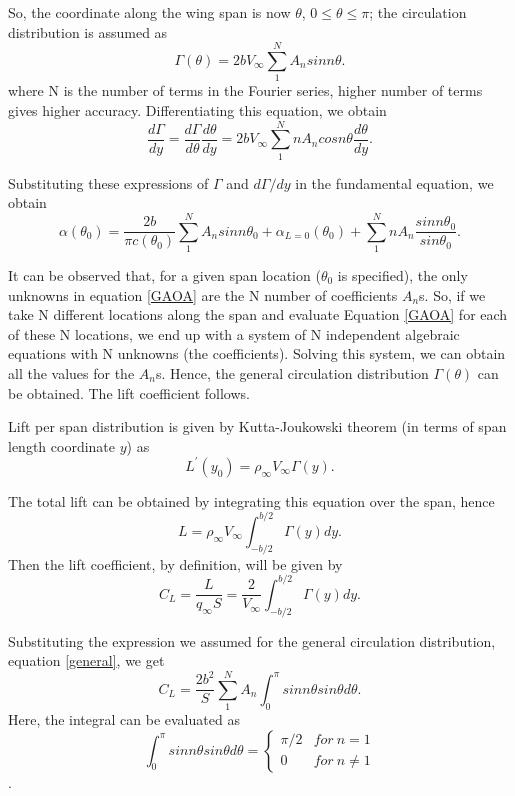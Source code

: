 \documentclass[letterpaper,12pt]{article}
\begin{document}
So, the coordinate along the wing span is now $\theta$, $0\leq\theta\leq\pi$; the circulation distribution is assumed as
\begin{equation}
\Gamma(\theta) = 2bV_\infty\sum_1^NA_nsinn\theta.
\label{general}
\end{equation}
where N is the number of terms in the Fourier series, higher number of terms gives higher accuracy. Differentiating this equation, we obtain
\begin{equation}
\frac{d\Gamma}{dy} = \frac{d\Gamma}{d\theta}\frac{d\theta}{dy} = 2bV_\infty\sum_1^NnA_ncosn\theta\frac{d\theta}{dy}.
\end{equation}

Substituting these expressions of $\Gamma$ and $d\Gamma/dy$ in the fundamental equation, we obtain
\begin{equation}
\boxed{
\alpha(\theta_0) = \frac{2b}{\pi c(\theta_0)}\sum_1^NA_nsinn\theta_0+\alpha_{L=0}(\theta_0)+\sum_1^NnA_n\frac{sinn\theta_0}{sin\theta_0}.
}
\label{GAOA}
\end{equation}

It can be observed that, for a given span location ($\theta_0$ is specified), the only unknowns in equation \ref{GAOA} are the N number of coefficients $A_n$s. So, if we take N different locations along the span and evaluate Equation \ref{GAOA} for each of these N locations, we end up with a system of N independent algebraic equations with N unknowns (the coefficients). Solving this system, we can obtain all the values for the $A_n$s. Hence, the general circulation distribution $\Gamma(\theta)$ can be obtained. The lift coefficient follows.

Lift per span distribution is given by Kutta-Joukowski theorem (in terms of span length coordinate $y$) as
\begin{equation}
L^{'}(y_0) = \rho_\infty V_\infty \Gamma(y).
\end{equation}

The total lift can be obtained by integrating this equation over the span, hence
\begin{equation}
L = \rho_\infty V_\infty\int_{-b/2}^{b/2}\Gamma(y)dy.
\end{equation}
Then the lift coefficient, by definition, will be given by
\begin{equation}
C_L = \frac{L}{q_\infty S} = \frac{2}{V_\infty}\int_{-b/2}^{b/2}\Gamma(y)dy.
\end{equation}

Substituting the expression we assumed for the general circulation distribution, equation \ref{general}, we get
\begin{equation}
C_L = \frac{2b^2}{S}\sum_1^NA_n\int_0^\pi sinn\theta sin\theta d\theta.
\end{equation}
Here, the integral can be evaluated as
\[
\int_0^\pi sinn\theta sin\theta d\theta =
\begin{cases}
\pi/2 &for\ n=1\\
0 &for\ n \neq 1
\end{cases}
\].
\end{document}
